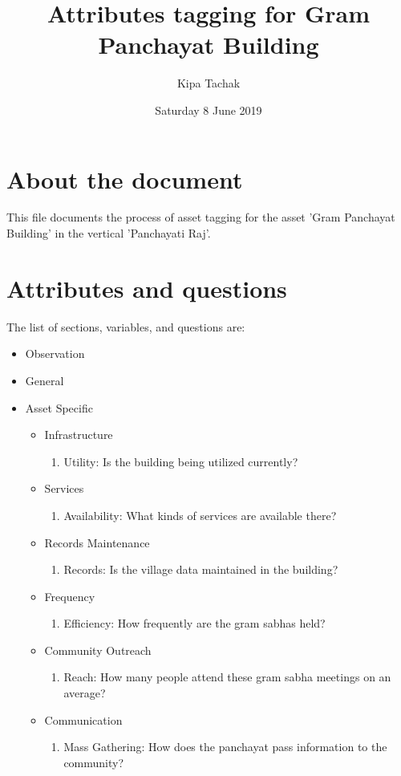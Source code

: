 \documentclass[oneside,twocolumn]{article}
\title{Attributes tagging for Gram Panchayat Building}
\author{Kipa Tachak}
\date{Saturday  8 June 2019}
\begin{document}
\maketitle

\section{About the document}
This file documents the process of asset tagging for the asset 'Gram Panchayat Building' in the vertical 'Panchayati Raj'.

\section{Attributes and questions}
The list of sections, variables, and questions are:
\begin{itemize}
	\item Observation
	\item General
	\item Asset Specific
		\begin{itemize}
			\item Infrastructure
				\begin{enumerate}
					\item Utility: Is the building being utilized currently?
				\end{enumerate}
			\item Services
				\begin{enumerate}
					\item Availability:  What kinds of services are available there?
				\end{enumerate}
			\item Records Maintenance
				\begin{enumerate}
					\item Records: Is the village data maintained in the building?
				\end{enumerate}
			\item Frequency
				\begin{enumerate}
					\item Efficiency: How frequently are the gram sabhas held?
				\end{enumerate}
			\item Community Outreach
				\begin{enumerate}
					\item Reach: How many people attend these gram sabha meetings on an average?
				\end{enumerate}
			\item Communication
				\begin{enumerate}
					\item Mass Gathering: How does the panchayat pass information to the community?
				\end{enumerate}
		\end{itemize}
\end{itemize}
\end{document}
